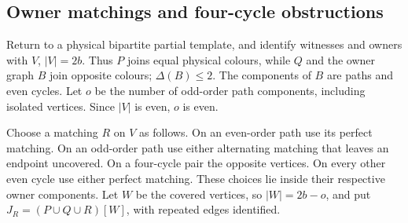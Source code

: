 \subsection{Owner matchings and four-cycle obstructions}

Return to a physical bipartite partial template, and identify witnesses and
owners with $V$, $|V|=2b$. Thus $P$ joins equal physical colours, while $Q$
and the owner graph $B$ join opposite colours; $\Delta(B)\le2$.
The components of $B$ are paths and even cycles. Let $o$ be the number of
odd-order path components, including isolated vertices. Since $|V|$ is even,
$o$ is even.

Choose a matching $R$ on $V$ as follows. On an even-order path use its
perfect matching. On an odd-order path use either alternating matching that
leaves an endpoint uncovered. On a four-cycle pair the opposite vertices.
On every other even cycle use either perfect matching. These choices lie
inside their respective owner components. Let $W$ be the covered vertices,
so $|W|=2b-o$, and put $J_R=(P\cup Q\cup R)[W]$, with repeated edges
identified.

